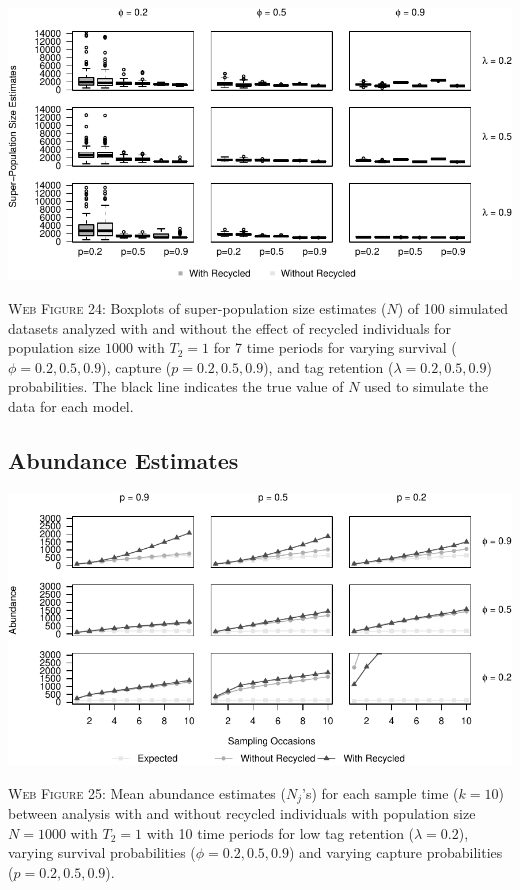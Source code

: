 \documentclass[]{article}
\begin{document}
\includegraphics{Appendix_BW_files/figure-latex/figure24_superN_GJSTL6-1.pdf}

\textsc{Web Figure 24:} Boxplots of super-population size estimates
(\(N\)) of 100 simulated datasets analyzed with and without the effect
of recycled individuals for population size \(1000\) with \(T_2=1\) for
7 time periods for varying survival (\(\phi=0.2,0.5,0.9\)), capture
(\(p=0.2,0.5,0.9\)), and tag retention (\(\lambda=0.2,0.5,0.9\))
probabilities. The black line indicates the true value of \(N\) used to
simulate the data for each model.

\newpage

\subsection{Abundance Estimates}\label{abundance-estimates}

\includegraphics{Appendix_BW_files/figure-latex/25_abundance_L_GJSTL1-1.pdf}

\textsc{Web Figure 25:} Mean abundance estimates (\(N_j\)'s) for each
sample time (\(k=10\)) between analysis with and without recycled
individuals with population size \(N=1000\) with \(T_2=1\) with 10 time
periods for low tag retention (\(\lambda=0.2\)), varying survival
probabilities (\(\phi=0.2,0.5,0.9\)) and varying capture probabilities
(\(p=0.2,0.5,0.9\)).
\end{document}
